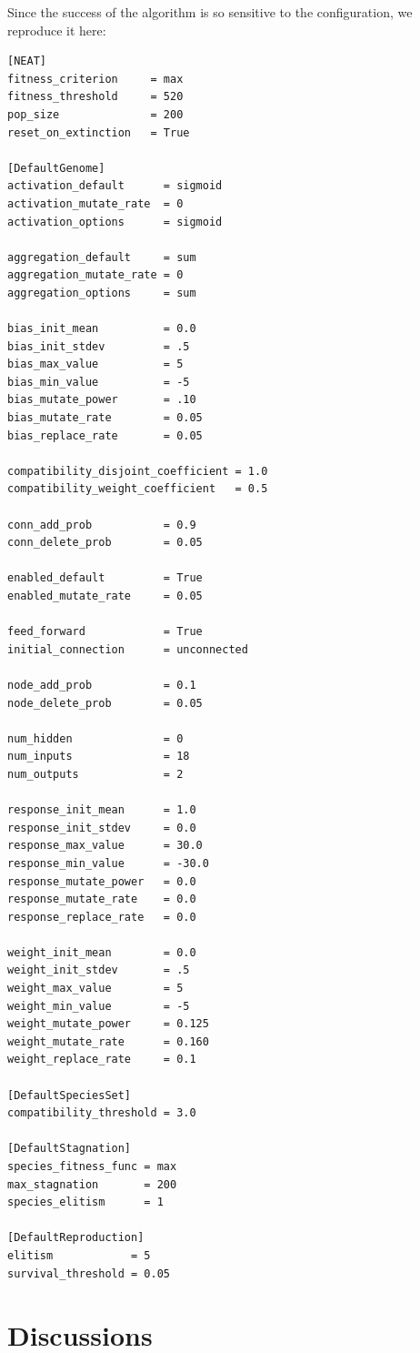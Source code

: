 \documentclass[letterpaper, twocolumn, conference]{article}
\begin{document}
Since the success of the algorithm is so sensitive to the configuration, we reproduce it here:
\begin{verbatim}
[NEAT]
fitness_criterion     = max
fitness_threshold     = 520
pop_size              = 200
reset_on_extinction   = True

[DefaultGenome]
activation_default      = sigmoid
activation_mutate_rate  = 0
activation_options      = sigmoid

aggregation_default     = sum
aggregation_mutate_rate = 0
aggregation_options     = sum

bias_init_mean          = 0.0
bias_init_stdev         = .5
bias_max_value          = 5
bias_min_value          = -5
bias_mutate_power       = .10
bias_mutate_rate        = 0.05
bias_replace_rate       = 0.05

compatibility_disjoint_coefficient = 1.0
compatibility_weight_coefficient   = 0.5

conn_add_prob           = 0.9
conn_delete_prob        = 0.05

enabled_default         = True
enabled_mutate_rate     = 0.05

feed_forward            = True
initial_connection      = unconnected

node_add_prob           = 0.1
node_delete_prob        = 0.05

num_hidden              = 0
num_inputs              = 18
num_outputs             = 2

response_init_mean      = 1.0
response_init_stdev     = 0.0
response_max_value      = 30.0
response_min_value      = -30.0
response_mutate_power   = 0.0
response_mutate_rate    = 0.0
response_replace_rate   = 0.0

weight_init_mean        = 0.0
weight_init_stdev       = .5
weight_max_value        = 5
weight_min_value        = -5
weight_mutate_power     = 0.125
weight_mutate_rate      = 0.160
weight_replace_rate     = 0.1

[DefaultSpeciesSet]
compatibility_threshold = 3.0

[DefaultStagnation]
species_fitness_func = max
max_stagnation       = 200
species_elitism      = 1

[DefaultReproduction]
elitism            = 5
survival_threshold = 0.05
\end{verbatim}



\section{Discussions}
\end{document}
